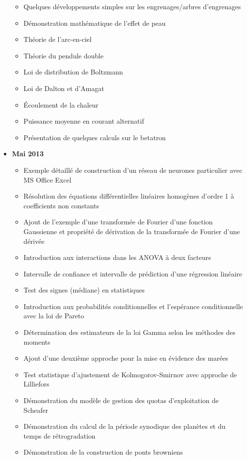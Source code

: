 \documentclass[12pt,a4paper,twoside,openright]{report}
\theoremstyle{definition}
\theoremstyle{itexmp}
\numberwithin{equation}{section}
\begin{document}
\begin{itemize}
\begin{itemize}[noitemsep]
				\item Quelques développements simples sur les engrenages/arbres d'engrenages
				\item Démonstration mathématique de l'effet de peau
				\item Théorie de l'arc-en-ciel
				\item Théorie du pendule double
				\item Loi de distribution de Boltzmann
				\item Loi de Dalton et d'Amagat
				\item Écoulement de la chaleur
				\item Puissance moyenne en courant alternatif
				\item Présentation de quelques calculs sur le betatron
			\end{itemize}
		\item \textbf{Mai 2013}
			\begin{itemize}[noitemsep]
				\item Exemple détaillé de construction d'un réseau de neurones particulier avec MS Office Excel
				\item Résolution des équations différentielles linéaires homogènes d'ordre 1 à coefficients non constants
				\item Ajout de l'exemple d'une transformée de Fourier d'une fonction Gaussienne et propriété de dérivation de la transformée de Fourier d'une dérivée
				\item Introduction aux interactions dans les ANOVA à deux facteurs
				\item Intervalle de confiance et intervalle de prédiction d'une régression linéaire
				\item Test des signes (médiane) en statistiques
				\item Introduction aux probabilités conditionnelles et l'espérance conditionnelle avec la loi de Pareto
				\item Détermination des estimateurs de la loi Gamma selon les méthodes des moments
				\item Ajout d'une deuxième approche pour la mise en évidence des marées
				\item Test statistique d'ajustement de Kolmogorov-Smirnov avec approche de Lilliefors
				\item Démonstration du modèle de gestion des quotas d'exploitation de Scheafer
				\item Démonstration du calcul de la période synodique des planètes et du temps de rétrogradation
				\item Démonstration de la construction de ponts browniens

\end{itemize}
\end{itemize}
\end{document}
